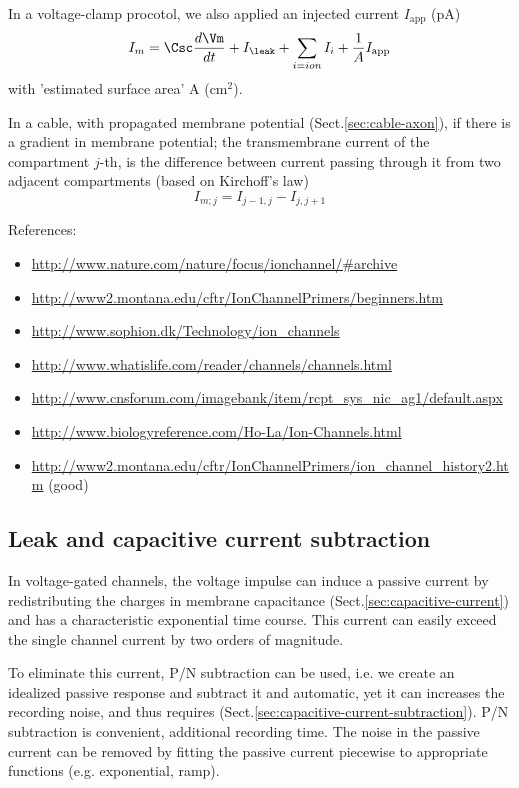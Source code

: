 In a voltage-clamp procotol, we also applied an injected current $I_\text{app}$
(pA)
\begin{equation}
I_m = \Csc \frac{d\Vm}{dt} + I_\leak + \sum_{i=ion} I_{i} + \frac{1}{A}
I_{\text{app}}
\end{equation}
with 'estimated surface area' A (cm$^2$).


In a cable, with propagated membrane potential (Sect.\ref{sec:cable-axon}), if
there is a gradient in membrane potential; the transmembrane current
of the compartment $j$-th, is the difference between current passing through it
from two adjacent compartments (based on Kirchoff's law)
\begin{equation}
I_{m;j} = I_{j-1,j} - I_{j,j+1}
\end{equation}

References:
\begin{itemize}
\item \url{http://www.nature.com/nature/focus/ionchannel/#archive}
\item \url{http://www2.montana.edu/cftr/IonChannelPrimers/beginners.htm}
\item \url{http://www.sophion.dk/Technology/ion_channels}
\item \url{http://www.whatislife.com/reader/channels/channels.html}
\item \url{http://www.cnsforum.com/imagebank/item/rcpt_sys_nic_ag1/default.aspx}
\item \url{http://www.biologyreference.com/Ho-La/Ion-Channels.html}
\item
  \url{http://www2.montana.edu/cftr/IonChannelPrimers/ion_channel_history2.htm} (good)
\end{itemize}

\subsection{Leak and capacitive current subtraction}
\label{sec:P/N-subtraction}
\label{sec:current-subtraction}

In voltage-gated channels, the voltage impulse can induce a passive current by
redistributing the charges in membrane capacitance
(Sect.\ref{sec:capacitive-current}) and has a characteristic exponential time
course. This current can easily exceed the single channel current by two orders
of magnitude.

To eliminate this current, P/N subtraction can be used, i.e. we create an
idealized passive response and subtract it
and automatic, yet it can increases the recording noise, and thus requires
(Sect.\ref{sec:capacitive-current-subtraction}). P/N subtraction is convenient,
additional recording time. The noise in the passive current can be removed by
fitting the passive current piecewise to appropriate functions (e.g.
exponential, ramp).

